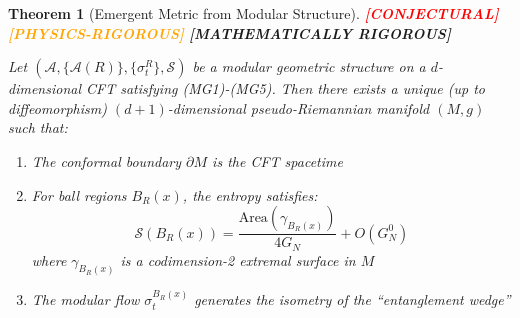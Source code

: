 \documentclass[12pt,a4paper]{article}
\newtheorem{theorem}{Theorem}[section]
\newcommand{\rigormark}[1]{%
  \ifcase#1
    \textcolor{red}{\textbf{[CONJECTURAL]}}%
  \or
    \textcolor{orange}{\textbf{[PHYSICS-RIGOROUS]}}%
  \or
    \textcolor{green!50!black}{\textbf{[MATHEMATICALLY RIGOROUS]}}%
  \fi
}
\begin{document}
\begin{theorem}[Emergent Metric from Modular Structure]\label{thm:emergent-metric}
\rigormark{2}

Let $(\mathcal{A}, \{\mathcal{A}(R)\}, \{\sigma^R_t\}, \mathcal{S})$ be a modular geometric structure on a $d$-dimensional CFT satisfying (MG1)-(MG5). Then there exists a unique (up to diffeomorphism) $(d+1)$-dimensional pseudo-Riemannian manifold $(M, g)$ such that:
\begin{enumerate}
    \item The conformal boundary $\partial M$ is the CFT spacetime
    \item For ball regions $B_R(x)$, the entropy satisfies:
    \begin{equation}
    \mathcal{S}(B_R(x)) = \frac{\text{Area}(\gamma_{B_R(x)})}{4G_N} + O(G_N^0)
    \end{equation}
    where $\gamma_{B_R(x)}$ is a codimension-2 extremal surface in $M$
    \item The modular flow $\sigma^{B_R(x)}_t$ generates the isometry of the ``entanglement wedge''
\end{enumerate}
\end{theorem}
\end{document}
